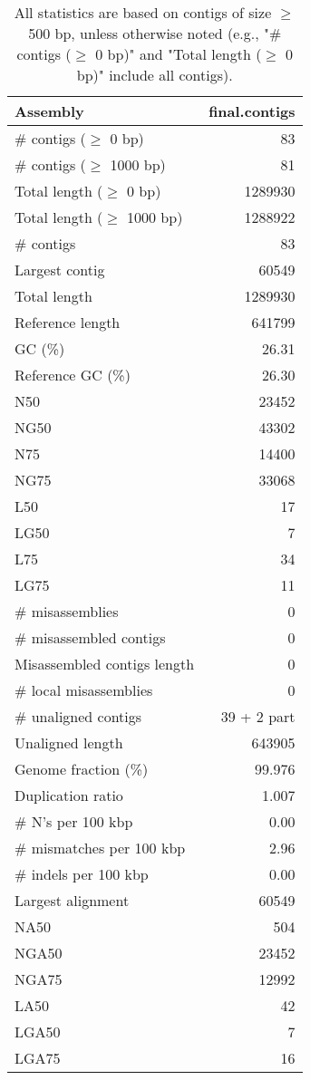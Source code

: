 \documentclass[12pt,a4paper]{article}
\begin{document}
\begin{table}[ht]
\begin{center}
\caption{All statistics are based on contigs of size $\geq$ 500 bp, unless otherwise noted (e.g., "\# contigs ($\geq$ 0 bp)" and "Total length ($\geq$ 0 bp)" include all contigs).}
\begin{tabular}{|l*{1}{|r}|}
\hline
Assembly & final.contigs \\ \hline
\# contigs ($\geq$ 0 bp) & 83 \\ \hline
\# contigs ($\geq$ 1000 bp) & 81 \\ \hline
Total length ($\geq$ 0 bp) & 1289930 \\ \hline
Total length ($\geq$ 1000 bp) & 1288922 \\ \hline
\# contigs & 83 \\ \hline
Largest contig & 60549 \\ \hline
Total length & 1289930 \\ \hline
Reference length & 641799 \\ \hline
GC (\%) & 26.31 \\ \hline
Reference GC (\%) & 26.30 \\ \hline
N50 & 23452 \\ \hline
NG50 & 43302 \\ \hline
N75 & 14400 \\ \hline
NG75 & 33068 \\ \hline
L50 & 17 \\ \hline
LG50 & 7 \\ \hline
L75 & 34 \\ \hline
LG75 & 11 \\ \hline
\# misassemblies & 0 \\ \hline
\# misassembled contigs & 0 \\ \hline
Misassembled contigs length & 0 \\ \hline
\# local misassemblies & 0 \\ \hline
\# unaligned contigs & 39 + 2 part \\ \hline
Unaligned length & 643905 \\ \hline
Genome fraction (\%) & 99.976 \\ \hline
Duplication ratio & 1.007 \\ \hline
\# N's per 100 kbp & 0.00 \\ \hline
\# mismatches per 100 kbp & 2.96 \\ \hline
\# indels per 100 kbp & 0.00 \\ \hline
Largest alignment & 60549 \\ \hline
NA50 & 504 \\ \hline
NGA50 & 23452 \\ \hline
NGA75 & 12992 \\ \hline
LA50 & 42 \\ \hline
LGA50 & 7 \\ \hline
LGA75 & 16 \\ \hline
\end{tabular}
\end{center}
\end{table}
\end{document}
